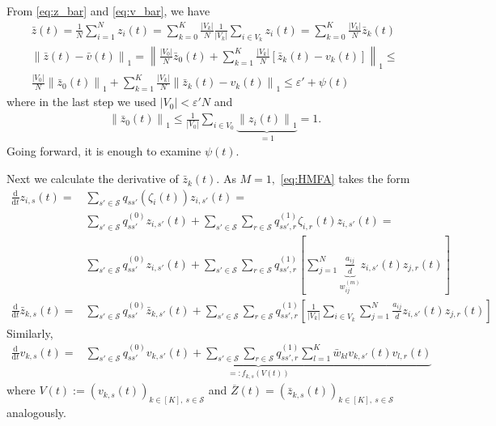 \documentclass{article}
\renewcommand{\d}{\mathrm{d}}
\newcommand{\1}[1]{{\mathds{1}}_{\left\{#1\right\}}}
\begin{document}
	From \eqref{eq:z_bar} and \eqref{eq:v_bar}, we have
	\begin{align*}
		&\bar{z}(t)=\frac{1}{N}\sum_{i=1}^{N}z_{i}(t)=\sum_{k=0}^{K} \frac{\left|V_k \right|}{N}\frac{1}{\left| V_k \right|}\sum_{i \in V_k}z_{i}(t)=\sum_{k=0}^{K} \frac{\left|V_k \right|}{N} \bar{z}_k(t) \\	
		&\left\|\bar{z}(t)-\bar{v}(t) \right \|_1= \left \| \frac{\left|V_0 \right|}{N} \bar{z}_{0}(t)+\sum_{k=1}^{K} \frac{\left|V_k \right|}{N} \left[\bar{z}_k(t)-v_k(t) \right] \right \|_1 \leq \\
		& \frac{\left|V_0 \right|}{N} \left \|\bar{z}_{0}(t) \right \|_{1}+\sum_{k=1}^{K} \frac{\left|V_k \right|}{N} \left \|\bar{z}_k(t)-v_k(t) \right \|_1 \leq \varepsilon'+\psi(t)
	\end{align*}
	where in the last step we used $\left|V_0 \right|<\varepsilon'N$ and
	\begin{align*}
		&  \left \|\bar{z}_{0}(t) \right \|_{1} \leq \frac{1}{\left|V_0 \right |}\sum_{i \in V_0}\underbrace{ \left \|z_{i}(t) \right \|_1}_{=1}=1.	
	\end{align*}
	Going forward, it is enough to examine $\psi(t).$
	
	Next we calculate the derivative of $\bar{z}_{k}(t).$ As $M=1,$ \eqref{eq:HMFA} takes the form
	\begin{align*}
		\frac{\d}{\d t} z_{i,s}(t)=&\sum_{s' \in \mathcal{S}}q_{ss'} \left(\zeta_{i}(t)\right)z_{i,s'}(t)=\\
		&\sum_{s' \in \mathcal{S}}q_{ss'}^{(0)} z_{i,s'}(t)+\sum_{s' \in \mathcal{S}}\sum_{r \in \mathcal{S}}q_{ss',r}^{(1)} \zeta_{i,r}(t)z_{i,s'}(t)=\\
		&\sum_{s' \in \mathcal{S}}q_{ss'}^{(0)} z_{i,s'}(t)+\sum_{s' \in \mathcal{S}}\sum_{r \in \mathcal{S}}q_{ss',r}^{(1)} \left[\sum_{j=1}^{N} \underbrace{\frac{a_{ij}}{\bar{d}}}_{w_{ij}^{(m)}}z_{i,s'}(t)z_{j,r}(t) \right]\\
		\frac{\d}{\d t}\bar{z}_{k,s}(t)=& \sum_{s' \in \mathcal{S}}q_{ss'}^{(0)} \bar{z}_{k,s'}(t)+\sum_{s' \in \mathcal{S}}\sum_{r \in \mathcal{S}}q_{ss',r}^{(1)} \left[\frac{1}{\left|V_k \right|}\sum_{i \in V_k}\sum_{j=1}^{N} \frac{a_{ij}}{\bar{d}}z_{i,s'}(t)z_{j,r}(t) \right]
	\end{align*}
	Similarly,
	\begin{align*}
		\frac{\d}{\d t} v_{k,s}(t)=&\underbrace{\sum_{s' \in \mathcal{S}}q_{ss'}^{(0)} v_{k,s'}(t)+\sum_{s' \in \mathcal{S}}\sum_{r \in \mathcal{S}}q_{ss',r}^{(1)}\sum_{l=1}^{K}{\bar{w}_{kl}}v_{k,s'}(t)v_{l,r}(t)}_{=:f_{k,s}\left(V(t)\right)}
	\end{align*}
	where $V(t):=\left(v_{k,s}(t)\right)_{k \in [K], \ s \in \mathcal{S}}$ and $\overline{Z}(t)=\left(\bar{z}_{k,s}(t)\right)_{k \in [K], \ s \in \mathcal{S}}$ analogously.
	
\end{document}
